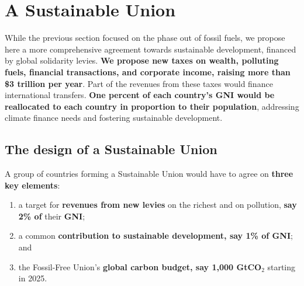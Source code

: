\documentclass[12pt,english]{article}
\begin{document}



\clearpage

\section{A Sustainable Union\label{sec:su}}

While the previous section focused on the phase out of fossil fuels, we propose here a more comprehensive agreement towards sustainable development, financed by global solidarity levies.\textbf{ We propose new taxes on wealth, polluting fuels, financial transactions, and corporate income, raising more than \$3 trillion per year}. Part of the revenues from these taxes would finance international transfers. \textbf{One percent of each country's GNI would be reallocated to each country in proportion to their population}, addressing climate finance needs and fostering sustainable development.

\subsection{The design of a Sustainable Union\label{subsec:principles_sa}}

A group of countries forming a Sustainable Union would have to agree on \textbf{three key elements}:
\begin{enumerate}
  \item a target for \textbf{revenues from new levies} on the richest and on pollution, \textbf{say 2\% of} their \textbf{GNI};
  \item a common \textbf{contribution to sustainable development, say 1\% of GNI}; and
  \item the Fossil-Free Union's \textbf{global carbon budget, say 1,000 GtCO$_\text{2}$} starting in 2025.
\end{enumerate}
\end{document}
